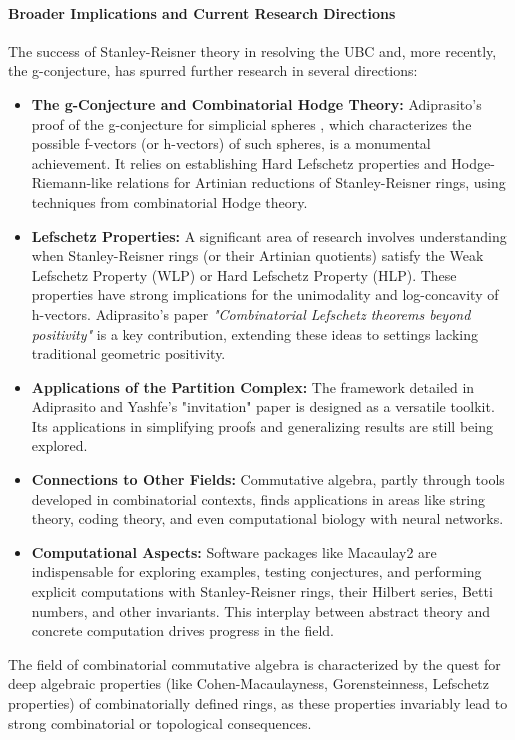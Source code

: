 \documentclass[12pt]{article}
\theoremstyle{definition}
\numberwithin{equation}{subsection}
\begin{document}
\paragraph{Broader Implications and Current Research Directions}
The success of Stanley-Reisner theory in resolving the UBC and, more recently, the g-conjecture, has spurred further research in several directions:
\begin{itemize}
\item \textbf{The g-Conjecture and Combinatorial Hodge Theory:} Adiprasito's proof of the g-conjecture for simplicial spheres , which characterizes the possible f-vectors (or h-vectors) of such spheres, is a monumental achievement. It relies on establishing Hard Lefschetz properties and Hodge-Riemann-like relations for Artinian reductions of Stanley-Reisner rings, using techniques from combinatorial Hodge theory.
\item \textbf{Lefschetz Properties:} A significant area of research involves understanding when Stanley-Reisner rings (or their Artinian quotients) satisfy the Weak Lefschetz Property (WLP) or Hard Lefschetz Property (HLP). These properties have strong implications for the unimodality and log-concavity of h-vectors. Adiprasito's paper \textit{"Combinatorial Lefschetz theorems beyond positivity"}  is a key contribution, extending these ideas to settings lacking traditional geometric positivity.
\item \textbf{Applications of the Partition Complex:} The framework detailed in Adiprasito and Yashfe's "invitation" paper  is designed as a versatile toolkit. Its applications in simplifying proofs and generalizing results are still being explored.
\item \textbf{Connections to Other Fields:} Commutative algebra, partly through tools developed in combinatorial contexts, finds applications in areas like string theory, coding theory, and even computational biology with neural networks.
\item \textbf{Computational Aspects:} Software packages like Macaulay2  are indispensable for exploring examples, testing conjectures, and performing explicit computations with Stanley-Reisner rings, their Hilbert series, Betti numbers, and other invariants. This interplay between abstract theory and concrete computation drives progress in the field.
\end{itemize}
The field of combinatorial commutative algebra is characterized by the quest for deep algebraic properties (like Cohen-Macaulayness, Gorensteinness, Lefschetz properties) of combinatorially defined rings, as these properties invariably lead to strong combinatorial or topological consequences.   
\end{document}
